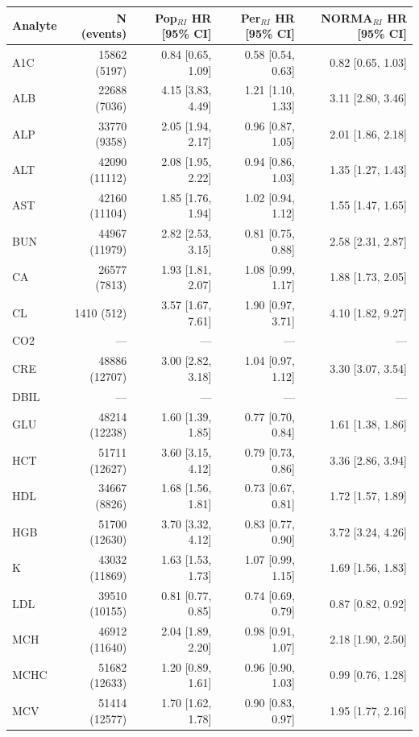 \begin{table}[ht]
\centering
\footnotesize
\begin{tabular}{lrrrr}
\toprule
Analyte & N (events) & Pop$_{RI}$ HR [95\% CI] & Per$_{RI}$ HR [95\% CI] & NORMA$_{RI}$ HR [95\% CI] \\
\midrule
A1C & 15862 (5197) & 0.84 [0.65, 1.09] & 0.58 [0.54, 0.63] & 0.82 [0.65, 1.03] \\
ALB & 22688 (7036) & 4.15 [3.83, 4.49] & 1.21 [1.10, 1.33] & 3.11 [2.80, 3.46] \\
ALP & 33770 (9358) & 2.05 [1.94, 2.17] & 0.96 [0.87, 1.05] & 2.01 [1.86, 2.18] \\
ALT & 42090 (11112) & 2.08 [1.95, 2.22] & 0.94 [0.86, 1.03] & 1.35 [1.27, 1.43] \\
AST & 42160 (11104) & 1.85 [1.76, 1.94] & 1.02 [0.94, 1.12] & 1.55 [1.47, 1.65] \\
BUN & 44967 (11979) & 2.82 [2.53, 3.15] & 0.81 [0.75, 0.88] & 2.58 [2.31, 2.87] \\
CA & 26577 (7813) & 1.93 [1.81, 2.07] & 1.08 [0.99, 1.17] & 1.88 [1.73, 2.05] \\
CL & 1410 (512) & 3.57 [1.67, 7.61] & 1.90 [0.97, 3.71] & 4.10 [1.82, 9.27] \\
CO2 & --- & --- & --- & --- \\
CRE & 48886 (12707) & 3.00 [2.82, 3.18] & 1.04 [0.97, 1.12] & 3.30 [3.07, 3.54] \\
DBIL & --- & --- & --- & --- \\
GLU & 48214 (12238) & 1.60 [1.39, 1.85] & 0.77 [0.70, 0.84] & 1.61 [1.38, 1.86] \\
HCT & 51711 (12627) & 3.60 [3.15, 4.12] & 0.79 [0.73, 0.86] & 3.36 [2.86, 3.94] \\
HDL & 34667 (8826) & 1.68 [1.56, 1.81] & 0.73 [0.67, 0.81] & 1.72 [1.57, 1.89] \\
HGB & 51700 (12630) & 3.70 [3.32, 4.12] & 0.83 [0.77, 0.90] & 3.72 [3.24, 4.26] \\
K & 43032 (11869) & 1.63 [1.53, 1.73] & 1.07 [0.99, 1.15] & 1.69 [1.56, 1.83] \\
LDL & 39510 (10155) & 0.81 [0.77, 0.85] & 0.74 [0.69, 0.79] & 0.87 [0.82, 0.92] \\
MCH & 46912 (11640) & 2.04 [1.89, 2.20] & 0.98 [0.91, 1.07] & 2.18 [1.90, 2.50] \\
MCHC & 51682 (12633) & 1.20 [0.89, 1.61] & 0.96 [0.90, 1.03] & 0.99 [0.76, 1.28] \\
MCV & 51414 (12577) & 1.70 [1.62, 1.78] & 0.90 [0.83, 0.97] & 1.95 [1.77, 2.16] \\

\end{tabular}
\end{table}
